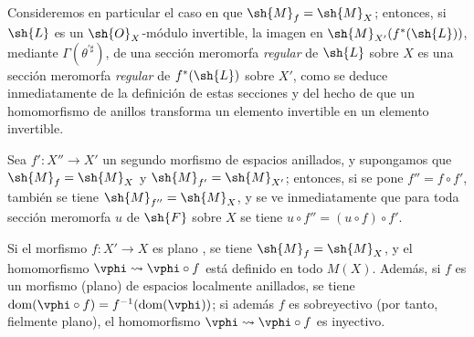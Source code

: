 \begin{env}[20.1.11]
Consideremos en particular el caso en que $\sh{M}_f=\sh{M}_X$; entonces, si $\sh{L}$ es un $\sh{O}_X$-módulo invertible, la imagen en $\sh{M}_{X'}(f^*(\sh{L}))$, mediante $\Gamma(\theta^{\prime\sharp})$, de una sección meromorfa \emph{regular} de $\sh{L}$ sobre $X$  es una sección meromorfa \emph{regular} de $f^*(\sh{L})$ sobre $X'$, como se deduce inmediatamente de la definición de estas secciones y del hecho de que un homomorfismo de anillos transforma un elemento invertible en un elemento invertible.

Sea $f':X''\to X'$ un segundo morfismo de espacios anillados, y supongamos que $\sh{M}_f=\sh{M}_X$ y $\sh{M}_{f'}=\sh{M}_{X'}$; entonces, si se pone $f''=f\circ f'$, también se tiene $\sh{M}_{f''}=\sh{M}_X$, y se ve inmediatamente que para toda sección meromorfa $u$ de $\sh{F}$ sobre $X$ se tiene $u\circ f''=(u\circ f)\circ f'$.
\end{env}

\begin{proposition}[20.1.12]
\label{IV.20.1.12}
Si el morfismo $f:X'\to X$ es plano , se tiene $\sh{M}_f=\sh{M}_X$, y el homomorfismo $\vphi\leadsto\vphi\circ f$ está definido en todo $M(X)$.
Además, si $f$ es un morfismo (plano) de espacios localmente anillados, se tiene $\operatorname{dom}(\vphi\circ f)=f^{-1}(\operatorname{dom}(\vphi))$; si además $f$ es sobreyectivo (por tanto, fielmente plano), el homomorfismo $\vphi\leadsto\vphi\circ f$ es inyectivo.
\end{proposition}

